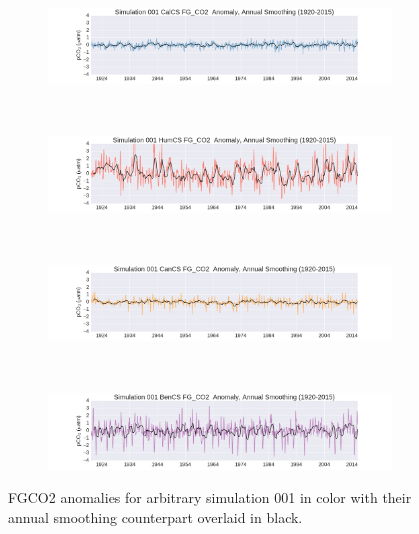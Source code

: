\documentclass[12pt]{article}
\begin{document}
\clearpage
\begin{figure}[!h]
	\centering
	\begin{subfigure}[b]{\textwidth}
		\centering
		\includegraphics[width=\linewidth]{../../figs/calcs/timeseries/calcs-filtered-fgco2-series-example-common-axis.png}
	\end{subfigure} \\
	\begin{subfigure}[b]{\textwidth}
		\centering
		\includegraphics[width=\linewidth]{../../figs/humcs/timeseries/humcs-filtered-fgco2-series-example-common-axis.png}
	\end{subfigure} \\
	\begin{subfigure}[b]{\textwidth}
		\centering
		\includegraphics[width=\linewidth]{../../figs/cancs/timeseries/cancs-filtered-fgco2-series-example-common-axis.png}
	\end{subfigure} \\
	\begin{subfigure}[b]{\textwidth}
		\centering
		\includegraphics[width=\linewidth]{../../figs/bencs/timeseries/bencs-filtered-fgco2-series-example-common-axis.png}
	\end{subfigure}
	\caption{FGCO2 anomalies for arbitrary simulation 001 in color with their annual smoothing counterpart overlaid in black.}
	\label{smoothed:series}
\end{figure}
\end{document}
